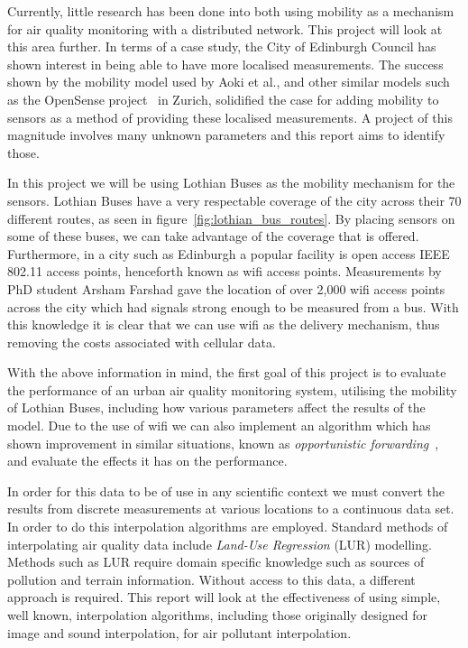    Currently, little research has been done into both using mobility as a mechanism for air quality monitoring with a distributed network. This project will look at this area further. In terms of a case study, the City of Edinburgh Council has shown interest in being able to have more localised measurements. The success shown by the mobility model used by Aoki et al., and other similar models such as the OpenSense project~\cite{opensensezurich} in Zurich, solidified the case for adding mobility to sensors as a method of providing these localised measurements. A project of this magnitude involves many unknown parameters and this report aims to identify those. 

    In this project we will be using Lothian Buses as the mobility mechanism for the sensors. Lothian Buses have a very respectable coverage of the city across their 70 different routes, as seen in figure~\ref{fig:lothian_bus_routes}. By placing sensors on some of these buses, we can take advantage of the coverage that is offered. Furthermore, in a city such as Edinburgh a popular facility is open access IEEE 802.11 access points, henceforth known as wifi access points. Measurements by PhD student Arsham Farshad gave the location of over 2,000 wifi access points across the city which had signals strong enough to be measured from a bus. With this knowledge it is clear that we can use wifi as the delivery mechanism, thus removing the costs associated with cellular data. 


    With the above information in mind, the first goal of this project is to evaluate the performance of an urban air quality monitoring system, utilising the mobility of Lothian Buses, including how various parameters affect the results of the model. Due to the use of wifi we can also implement an algorithm which has shown improvement in similar situations, known as \emph{opportunistic forwarding}~\cite{opportunisticforwarding}, and evaluate the effects it has on the performance. 

    In order for this data to be of use in any scientific context we must convert the results from discrete measurements at various locations to a continuous data set. In order to do this interpolation algorithms are employed. Standard methods of interpolating air quality data include \emph{Land-Use Regression} (LUR) modelling. Methods such as LUR require domain specific knowledge such as sources of pollution and terrain information. Without access to this data, a different approach is required. This report will look at the effectiveness of using simple, well known, interpolation algorithms, including those originally designed for image and sound interpolation, for air pollutant interpolation.


